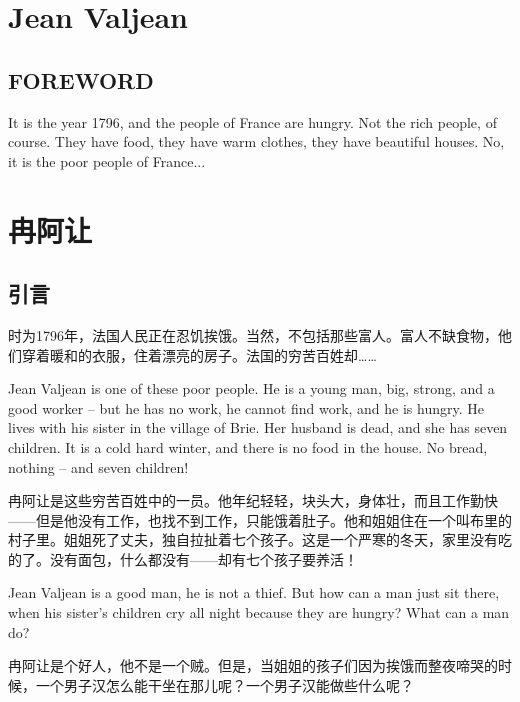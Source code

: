 \documentclass[fontset=ubuntu, zihao=5]{ctexart}
\begin{document}
\clearpage

\begin{paracol}{2}

  \section{Jean Valjean}

  \subsection*{FOREWORD}

  It is the year 1796, and the people of France are hungry. Not the rich people, of course. They have food, they have warm clothes, they have beautiful houses. No, it is the poor people of France...

  \switchcolumn

  \section*{冉阿让}
  \subsection*{引言}

  时为1796年，法国人民正在忍饥挨饿。当然，不包括那些富人。富人不缺食物，他们穿着暖和的衣服，住着漂亮的房子。法国的穷苦百姓却……

  \switchcolumn*

  Jean Valjean is one of these poor people. He is a young man, big, strong, and a good worker – but he has no work, he cannot find work, and he is hungry. He lives with his sister in the village of Brie. Her husband is dead, and she has seven children. It is a cold hard winter, and there is no food in the house. No bread, nothing – and seven children!

  \switchcolumn
  冉阿让是这些穷苦百姓中的一员。他年纪轻轻，块头大，身体壮，而且工作勤快——但是他没有工作，也找不到工作，只能饿着肚子。他和姐姐住在一个叫布里的村子里。姐姐死了丈夫，独自拉扯着七个孩子。这是一个严寒的冬天，家里没有吃的了。没有面包，什么都没有——却有七个孩子要养活！

  \switchcolumn*

  Jean Valjean is a good man, he is not a thief. But how can a man just sit there, when his sister's children cry all night because they are hungry? What can a man do?

  \switchcolumn

  冉阿让是个好人，他不是一个贼。但是，当姐姐的孩子们因为挨饿而整夜啼哭的时候，一个男子汉怎么能干坐在那儿呢？一个男子汉能做些什么呢？


\end{paracol}
\end{document}
